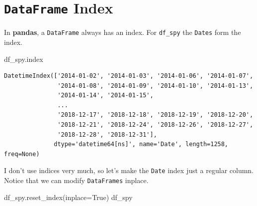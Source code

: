\documentclass[
  letterpaper,
  DIV=11,
  numbers=noendperiod]{scrreprt}
\newenvironment{Shaded}{\begin{snugshade}}{\end{snugshade}}
\newcommand{\NormalTok}[1]{\textcolor[rgb]{0.00,0.23,0.31}{#1}}
\newcommand{\OperatorTok}[1]{\textcolor[rgb]{0.37,0.37,0.37}{#1}}
\newcommand{\VariableTok}[1]{\textcolor[rgb]{0.07,0.07,0.07}{#1}}
\begin{document}
\hypertarget{dataframe-index}{%
\section{\texorpdfstring{\texttt{DataFrame}
Index}{DataFrame Index}}\label{dataframe-index}}

In \textbf{pandas}, a \texttt{DataFrame} always has an index. For
\texttt{df\_spy} the \texttt{Dates} form the index.

\begin{Shaded}
\begin{Highlighting}[]
\NormalTok{df\_spy.index}
\end{Highlighting}
\end{Shaded}

\begin{verbatim}
DatetimeIndex(['2014-01-02', '2014-01-03', '2014-01-06', '2014-01-07',
               '2014-01-08', '2014-01-09', '2014-01-10', '2014-01-13',
               '2014-01-14', '2014-01-15',
               ...
               '2018-12-17', '2018-12-18', '2018-12-19', '2018-12-20',
               '2018-12-21', '2018-12-24', '2018-12-26', '2018-12-27',
               '2018-12-28', '2018-12-31'],
              dtype='datetime64[ns]', name='Date', length=1258, freq=None)
\end{verbatim}

I don't use indices very much, so let's make the \texttt{Date} index
just a regular column. Notice that we can modify \texttt{DataFrames}
inplace.

\begin{Shaded}
\begin{Highlighting}[]
\NormalTok{df\_spy.reset\_index(inplace}\OperatorTok{=}\VariableTok{True}\NormalTok{)}
\NormalTok{df\_spy}
\end{Highlighting}
\end{Shaded}
\end{document}
